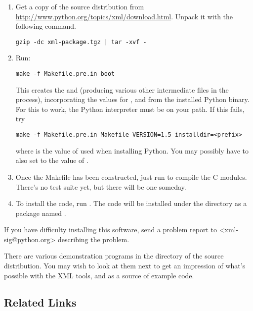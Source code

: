 \documentclass{howto}
\begin{document}
\begin{enumerate}
\item Get a copy of the source distribution from \url{http://www.python.org/topics/xml/download.html}.  Unpack it with the following command.

\begin{verbatim}
gzip -dc xml-package.tgz | tar -xvf -
\end{verbatim}

\item
 Run:
\begin{verbatim}
make -f Makefile.pre.in boot
\end{verbatim}

This creates the 
and
 (producing various other intermediate files in the process), incorporating the values for , 
and  from the installed Python binary.  For this to work,
the Python interpreter must be on your path.  If this fails, try

\begin{verbatim}
make -f Makefile.pre.in Makefile VERSION=1.5 installdir=<prefix>
\end{verbatim}

where  is the value of  used when
installing Python.  You may possibly have to also set
 to the value of .

\item
 Once the Makefile has been constructed, just run  to
 compile the C modules.  There's no test suite yet, but there will be
 one someday.

\item
To install the code, run .
 The code will be installed under the  directory
 as a package named .  

\end{enumerate}

If you have difficulty installing this software, send a problem report
to <xml-sig@python.org> describing the problem.

There are various demonstration programs in the  directory
of the source distribution.  You may wish to look at them next to get
an impression of what's possible with the XML tools, and as a source
of example code.


\subsection{Related Links}
\end{document}

